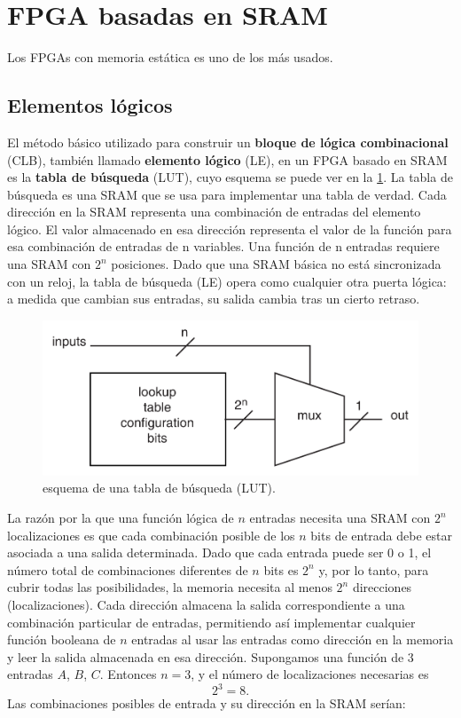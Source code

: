 \section{FPGA basadas en SRAM}

Los FPGAs con memoria estática es uno de los más usados. 


\subsection{Elementos lógicos}

El método básico utilizado para construir un \textbf{bloque de lógica combinacional} (CLB), también llamado \textbf{elemento lógico} (LE), en un FPGA basado en SRAM es la \textbf{tabla de búsqueda} (LUT), cuyo esquema se puede ver en la \cref{Fig:03-LUT}. La tabla de búsqueda es una SRAM que se usa para implementar una tabla de verdad. Cada dirección en la SRAM representa una combinación de entradas del elemento lógico. El valor almacenado en esa dirección representa el valor de la función para esa combinación de entradas de n variables. Una función de n entradas requiere una SRAM con $2^n$ posiciones. Dado que una SRAM básica no está sincronizada con un reloj, la tabla de búsqueda (LE) opera como cualquier otra puerta lógica: a medida que cambian sus entradas, su salida cambia tras un cierto retraso.

\begin{figure}[H] \centering
    \includegraphics[width=0.6\linewidth]{Imagenes/03-LUT.png}
    \caption{esquema de una tabla de búsqueda (LUT).}
    \label{Fig:03-LUT}
\end{figure}

La razón por la que una función lógica de $n$ entradas necesita una SRAM con $2^n$ localizaciones es que cada combinación posible de los $n$ bits de entrada debe estar asociada a una salida determinada. Dado que cada entrada puede ser 0 o 1, el número total de combinaciones diferentes de $n$ bits es $2^n$ y, por lo tanto, para cubrir todas las posibilidades, la memoria necesita al menos $2^n$ direcciones (localizaciones). Cada dirección almacena la salida correspondiente a una combinación particular de entradas, permitiendo así implementar cualquier función booleana de $n$ entradas al usar las entradas como dirección en la memoria y leer la salida almacenada en esa dirección. Supongamos una función de 3 entradas $A$, $B$, $C$. Entonces $n=3$, y el número de localizaciones necesarias es
$$
2^3=8.
$$
Las combinaciones posibles de entrada y su dirección en la SRAM serían:

